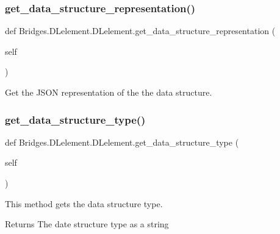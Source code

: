 \subsubsection{\texorpdfstring{get\+\_\+data\+\_\+structure\+\_\+representation()}{get\_data\_structure\_representation()}}
{\footnotesize\ttfamily def Bridges.\+D\+Lelement.\+D\+Lelement.\+get\+\_\+data\+\_\+structure\+\_\+representation (\begin{DoxyParamCaption}\item[{}]{self }\end{DoxyParamCaption})}



Get the J\+S\+ON representation of the the data structure. 

\mbox{\label{class_bridges_1_1_d_lelement_1_1_d_lelement_af8a80f719f6f8c7b9f5e45fe11d250ea}} 
\subsubsection{\texorpdfstring{get\+\_\+data\+\_\+structure\+\_\+type()}{get\_data\_structure\_type()}}
{\footnotesize\ttfamily def Bridges.\+D\+Lelement.\+D\+Lelement.\+get\+\_\+data\+\_\+structure\+\_\+type (\begin{DoxyParamCaption}\item[{}]{self }\end{DoxyParamCaption})}



This method gets the data structure type. 

\begin{DoxyReturn}{Returns}
The date structure type as a string 
\end{DoxyReturn}
\mbox{\label{class_bridges_1_1_d_lelement_1_1_d_lelement_ab3aae005a6e37d25b7d7c6c4cb1bdecf}} 
